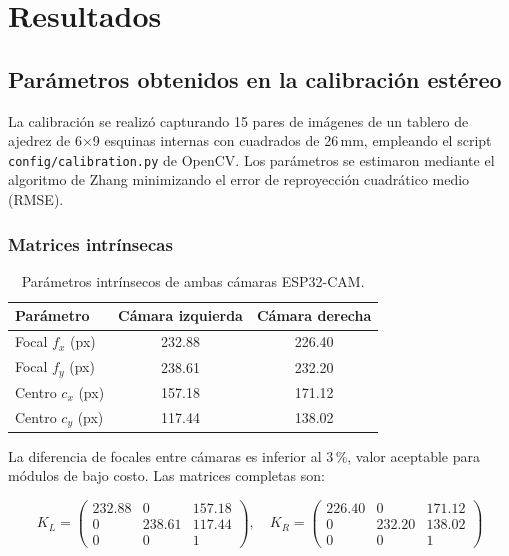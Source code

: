\section{Resultados}

\subsection{Parámetros obtenidos en la calibración estéreo}

La calibración se realizó capturando 15 pares de imágenes de un tablero de ajedrez de 6×9 esquinas internas con cuadrados de 26\,mm, empleando el script \texttt{config/calibration.py} de OpenCV. Los parámetros se estimaron mediante el algoritmo de Zhang \cite{zhang2000flexible} minimizando el error de reproyección cuadrático medio (RMSE).

\subsubsection{Matrices intrínsecas}

\begin{table}[H]
\centering
\caption{Parámetros intrínsecos de ambas cámaras ESP32-CAM.}
\label{tab:intrinsecos}
\begin{tabular}{lcc}
\hline
\textbf{Parámetro} & \textbf{Cámara izquierda} & \textbf{Cámara derecha} \\
\hline
Focal $f_x$ (px)     & 232.88 & 226.40 \\
Focal $f_y$ (px)     & 238.61 & 232.20 \\
Centro $c_x$ (px)    & 157.18 & 171.12 \\
Centro $c_y$ (px)    & 117.44 & 138.02 \\
\hline
\end{tabular}
\end{table}

La diferencia de focales entre cámaras es inferior al 3\,\%, valor aceptable para módulos de bajo costo. Las matrices completas son:

\[
K_L = \begin{pmatrix}
232.88 & 0 & 157.18 \\
0 & 238.61 & 117.44 \\
0 & 0 & 1
\end{pmatrix}, \quad
K_R = \begin{pmatrix}
226.40 & 0 & 171.12 \\
0 & 232.20 & 138.02 \\
0 & 0 & 1
\end{pmatrix}
\]

